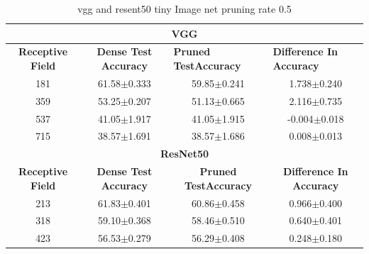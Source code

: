 \begin{table}[]
\begin{tabular}{@{}cccc@{}}
\toprule
\multicolumn{4}{c}{\textbf{VGG}}                                                                                                                                  \\ \midrule
\textbf{Receptive Field} & \textbf{Dense Test Accuracy} & \multicolumn{1}{l}{\textbf{Pruned  TestAccuracy}} & \multicolumn{1}{l}{\textbf{Difference In Accuracy}} \\ \midrule
181                      & 61.58$\pm$0.333              & 59.85$\pm$0.241                                   & 1.738$\pm$0.240                                     \\
359                      & 53.25$\pm$0.207              & 51.13$\pm$0.665                                   & 2.116$\pm$0.735                                     \\
537                      & 41.05$\pm$1.917              & 41.05$\pm$1.915                                   & -0.004$\pm$0.018                                    \\
715                      & 38.57$\pm$1.691              & 38.57$\pm$1.686                                   & 0.008$\pm$0.013                                     \\ \midrule
\multicolumn{4}{c}{\textbf{ResNet50}}                                                                                                                             \\ \midrule
\textbf{Receptive Field} & \textbf{Dense Test Accuracy} & \textbf{Pruned  TestAccuracy}                     & \textbf{Difference In Accuracy}                     \\
213                      & 61.83$\pm$0.401              & 60.86$\pm$0.458                                   & 0.966$\pm$0.400                                     \\
318                      & 59.10$\pm$0.368              & 58.46$\pm$0.510                                   & 0.640$\pm$0.401                                     \\
423                      & 56.53$\pm$0.279              & 56.29$\pm$0.408                                   & 0.248$\pm$0.180                                     \\ \bottomrule
\end{tabular}
\caption{vgg and resent50 tiny Image net pruning rate 0.5}
\label{tab:tiny imagenet pruning rate06}
\end{table}

